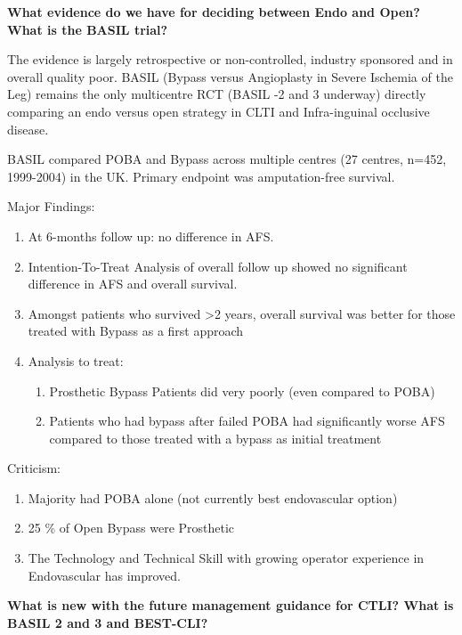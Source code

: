 \documentclass[
]{book}
\begin{document}
\textbf{What evidence do we have for deciding between Endo and Open? What is
the BASIL trial?}

The evidence is largely retrospective or non-controlled, industry
sponsored and in overall quality poor. BASIL (Bypass versus Angioplasty
in Severe Ischemia of the Leg) remains the only multicentre RCT (BASIL
-2 and 3 underway) directly comparing an endo versus open strategy in
CLTI and Infra-inguinal occlusive disease.~

BASIL compared POBA and Bypass across multiple centres (27 centres,
n=452, 1999-2004) in the UK. Primary endpoint was amputation-free
survival. \citep{bradburyBypassAngioplastySevere2005}

Major Findings:

\begin{enumerate}
\def\labelenumi{\arabic{enumi}.}
\item
  At 6-months follow up: no difference in AFS.
\item
  Intention-To-Treat Analysis of overall follow up showed no
  significant difference in AFS and overall survival.
\item
  Amongst patients who survived \textgreater2 years, overall survival was better
  for those treated with Bypass as a first approach
\item
  Analysis to treat:~

  \begin{enumerate}
  \def\labelenumii{\arabic{enumii}.}
  \item
    Prosthetic Bypass Patients did very poorly (even compared to
    POBA)~~
  \item
    Patients who had bypass after failed POBA had significantly
    worse AFS compared to those treated with a bypass as initial
    treatment
  \end{enumerate}
\end{enumerate}

Criticism:

\begin{enumerate}
\def\labelenumi{\arabic{enumi}.}
\item
  Majority had POBA alone (not currently best endovascular option)
\item
  25 \% of Open Bypass were Prosthetic
\item
  The Technology and Technical Skill with growing operator experience
  in Endovascular has improved.
\end{enumerate}

\textbf{What is new with the future management guidance for CTLI? What is
BASIL 2 and 3 and BEST-CLI?}
\end{document}
